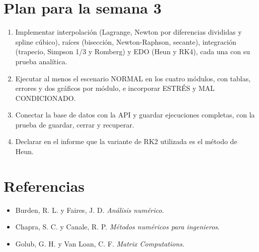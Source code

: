\documentclass[
  11pt,
  letterpaper,
]{article}
\providecommand{\tightlist}{%
  \setlength{\itemsep}{0pt}\setlength{\parskip}{0pt}}
\begin{document}
\hypertarget{plan-para-la-semana-3}{%
\section{Plan para la semana 3}\label{plan-para-la-semana-3}}

\begin{enumerate}
\def\labelenumi{\arabic{enumi}.}
\tightlist
\item
  Implementar interpolación (Lagrange, Newton por diferencias divididas
  y spline cúbico), raíces (bisección, Newton-Raphson, secante),
  integración (trapecio, Simpson 1/3 y Romberg) y EDO (Heun y RK4), cada
  una con su prueba analítica.
\item
  Ejecutar al menos el escenario NORMAL en los cuatro módulos, con
  tablas, errores y dos gráficos por módulo, e incorporar ESTRÉS y MAL
  CONDICIONADO.
\item
  Conectar la base de datos con la API y guardar ejecuciones completas,
  con la prueba de guardar, cerrar y recuperar.
\item
  Declarar en el informe que la variante de RK2 utilizada es el método
  de Heun.
\end{enumerate}

\hypertarget{referencias}{%
\section*{Referencias}\label{referencias}}

\begin{itemize}
\tightlist
\item
  Burden, R. L. y Faires, J. D. \emph{Análisis numérico}.
\item
  Chapra, S. C. y Canale, R. P. \emph{Métodos numéricos para
  ingenieros}.
\item
  Golub, G. H. y Van Loan, C. F. \emph{Matrix Computations}.
\end{itemize}
\end{document}
